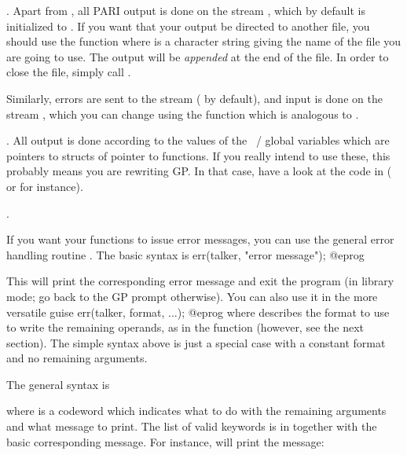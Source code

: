 . Apart from , all PARI output is done on
the stream , which by default is initialized to . If
you want that your output be directed to another file, you should use the
function  where  is a
character string giving the name of the file you are going to use. The
output will be {\it appended\/} at the end of the file. In order to close
the file, simply call .

Similarly, errors are sent to the stream  (
by default), and input is done on the stream , which you can change
using the function  which is analogous to .

. All output is done according to the values
of the ~/  global variables which are pointers to
structs of pointer to functions. If you really intend to use these, this
probably means you are rewriting GP. In that case, have a look at the code in
 ( or  for instance).

.

\noindent
If you want your functions to issue error messages, you can use the general
error handling routine . The basic syntax is
%
\bprog
  err(talker, "error message");
@eprog

\noindent
This will print the corresponding error message and exit the program (in
library mode; go back to the GP prompt otherwise).\label{se:err} You can
also use it in the more versatile guise
\bprog
  err(talker, format, ...);
@eprog\noindent
where  describes the format to use to write the remaining
operands, as in the  function (however, see the next section).
The simple syntax above is just a special case with a constant format and no
remaining arguments.

\noindent
The general syntax is


\noindent where  is a codeword which indicates what to do with
the remaining arguments and what message to print. The list of valid keywords
is in  together with the basic corresponding
message. For instance,  will print the message:


